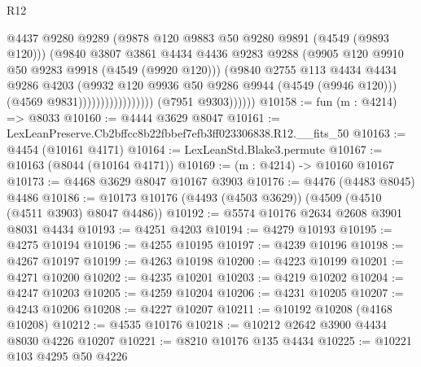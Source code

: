 \begin{lexlean}{R12}
\begin{coremodule}
                                          @4437
                                          @9280
                                          @9289
                                          (@9878 @120 @9883 @50 @9280 @9891 (@4549 (@9893 @120)))
                                          (@9840
                                            @3807
                                            @3861
                                            @4434
                                            @4436
                                            @9283
                                            @9288
                                            (@9905 @120 @9910 @50 @9283 @9918 (@4549 (@9920 @120)))
                                            (@9840
                                              @2755
                                              @113
                                              @4434
                                              @4434
                                              @9286
                                              @4203
                                              (@9932
                                                @120
                                                @9936
                                                @50
                                                @9286
                                                @9944
                                                (@4549 (@9946 @120)))
                                              (@4569 @9831)))))))))))))))))
              (@7951 @9303))))))
@10158 := fun (m : @4214) => @8033
@10160 := @4444 @3629 @8047
@10161 := LexLeanPreserve.Cb2bffcc8b22fbbef7efb3ff023306838.R12.__fits_50
@10163 := @4454 (@10161 @4171)
@10164 := LexLeanStd.Blake3.permute
@10167 := @10163 (@8044 (@10164 @4171))
@10169 := (m : @4214) -> @10160 @10167
@10173 := @4468 @3629 @8047 @10167 @3903
@10176 := @4476 (@4483 @8045) @4486
@10186 := @10173 @10176 (@4493 (@4503 @3629)) (@4509 (@4510 (@4511 @3903) @8047 @4486))
@10192 := @5574 @10176 @2634 @2608 @3901 @8031 @4434
@10193 := @4251 @4203
@10194 := @4279 @10193
@10195 := @4275 @10194
@10196 := @4255 @10195
@10197 := @4239 @10196
@10198 := @4267 @10197
@10199 := @4263 @10198
@10200 := @4223 @10199
@10201 := @4271 @10200
@10202 := @4235 @10201
@10203 := @4219 @10202
@10204 := @4247 @10203
@10205 := @4259 @10204
@10206 := @4231 @10205
@10207 := @4243 @10206
@10208 := @4227 @10207
@10211 := @10192 @10208 (@4168 @10208)
@10212 := @4535 @10176
@10218 := @10212 @2642 @3900 @4434 @8030 @4226 @10207
@10221 := @8210 @10176 @135 @4434
@10225 := @10221 @103 @4295 @50 @4226

\end{coremodule}
\end{lexlean}
